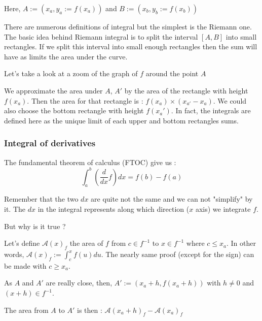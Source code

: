 \documentclass[12pt]{article}
\begin{document}
\begin{figure}[H]
 \centering
 
\end{figure}

Here, $A := (x_a, y_a:=f(x_a))$ and $B := (x_b, y_b:=f(x_b))$

There are numerous definitions of integral but the simplest is the Riemann \cite{wiki_riemann_integral} one. The basic idea behind Riemann integral is to split the interval $[A, B]$ into small rectangles. If we split this interval into small enough rectangles then the sum will have as limits the area under the curve.

Let's take a look at a zoom of the graph of $f$ around the point $A$


\begin{figure}[H]
 \centering
 
\end{figure}


We approximate the area under $A$, $A'$ by the area of the rectangle with height $f(x_a)$. Then the area for that rectangle is : $f(x_a) \times (x_{a'} - x_a)$. We could also choose the bottom rectangle with height $f(x_a')$. In fact, the integrals are defined here as the unique limit of each upper and bottom rectangles sums.

\subsubsection{Integral of derivatives}

The fundamental theorem of calculus (FTOC) \cite{wiki_fundamental_theorem_calculus} give us : 
$$ \int_a^b (\frac{d}{dx}f)dx = f(b) - f(a) $$

Remember that the two $dx$ are quite not the same and we can not "simplify" by it. The $dx$ in the integral represents along which direction ($x$ axis) we integrate $f$.

But why is it true ?

Let's define $\mathcal{A}(x)_f$ the area of $f$ from $c \in f^{-1}$ to $x \in f^{-1}$ where $c \leq x_a$. In other words, $\mathcal{A}(x)_f := \int_c^{x}f(u)du$. The nearly same proof (except for the sign) can be made with $c \geq x_a$.

As $A$ and $A'$ are really close, then, $A' := (x_a+h, f(x_a+h))$ with $h \neq 0$ and $(x+h) \in f^{-1}$.

The area from $A$ to $A'$ is then : $\mathcal{A}(x_a+h)_f - \mathcal{A}(x_a)_f$
\end{document}
